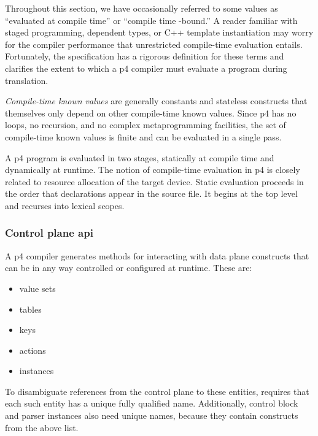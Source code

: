 Throughout this section, we have occasionally referred to some values as
``evaluated at compile time'' or ``compile time -bound.'' A reader familiar with staged programming,
dependent types, or C++ template instantiation may worry for the compiler
performance that unrestricted compile-time evaluation entails. Fortunately, the
\pfs specification has a rigorous definition for these terms and clarifies the
extent to which a \acrshort{p4} compiler must evaluate a program during
translation.

\emph{Compile-time known values} are generally constants and stateless
constructs that themselves only depend on other compile-time known values. Since
\acrshort{p4} has no loops, no recursion, and no complex metaprogramming
facilities, the set of compile-time known values is finite and can be evaluated
in a single pass.

A \acrshort{p4} program is evaluated in two stages, statically at compile time
and dynamically at runtime. The notion of compile-time evaluation in
\acrshort{p4} is closely related to resource allocation of the target device.
Static evaluation proceeds in the order that declarations appear in the source
file. It begins at the top level and recurses into lexical scopes.


\subsubsection*{Control plane \acrshort{api}}

A \acrshort{p4} compiler generates methods for interacting with data plane
constructs that can be in any way controlled or configured at runtime. These are:

\begin{itemize}
	\item value sets
	\item tables
	\item keys
	\item actions
	\item \extern{} instances
\end{itemize}

To disambiguate references from the control plane to these entities, \pfs
requires that each such entity has a unique fully qualified name. Additionally,
control block and parser instances also need unique names, because they contain
constructs from the above list.

